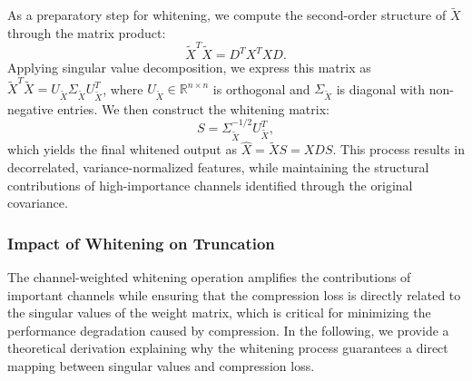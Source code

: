 \documentclass[11pt]{article}
\begin{document}
As a preparatory step for whitening, we compute the second-order structure of \(\tilde{X}\) through the matrix product:
\begin{equation}
\tilde{X}^T \tilde{X} = D^T X^T X D.
\end{equation}
Applying singular value decomposition, we express this matrix as \(\tilde{X}^T \tilde{X} = U_{\tilde{X}} \Sigma_{\tilde{X}} U_{\tilde{X}}^T\), where \(U_{\tilde{X}} \in \mathbb{R}^{n \times n}\) is orthogonal and \(\Sigma_{\tilde{X}}\) is diagonal with non-negative entries. We then construct the whitening matrix:
\begin{equation}
S = \Sigma_{\tilde{X}}^{-1/2} U_{\tilde{X}}^T,
\end{equation}
which yields the final whitened output as \(\hat{X} = \tilde{X} S = X D S\). This process results in decorrelated, variance-normalized features, while maintaining the structural contributions of high-importance channels identified through the original covariance.











\subsubsection{Impact of Whitening on Truncation}

The channel-weighted whitening operation amplifies the contributions of important channels while ensuring that the compression loss is directly related to the singular values of the weight matrix, which is critical for minimizing the performance degradation caused by compression. In the following, we provide a theoretical derivation explaining why the whitening process guarantees a direct mapping between singular values and compression loss.

\end{document}
